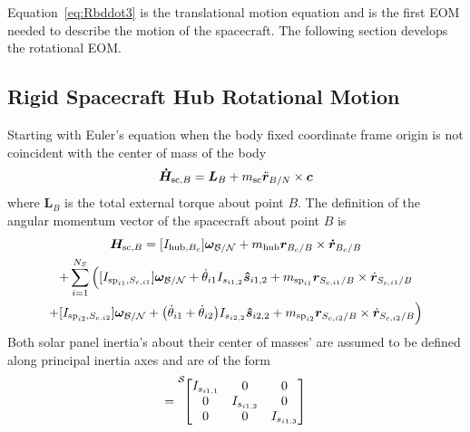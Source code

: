\documentclass[paper]{aiaaNew}
\begin{document}
	Equation~\eqref{eq:Rbddot3} is the translational motion equation and is the first EOM needed to describe the motion of the spacecraft. The following section develops the rotational EOM.
	
	\subsection{Rigid Spacecraft Hub Rotational Motion}
	
	Starting with Euler's equation when the body fixed coordinate frame origin is not coincident with the center of mass of the body\cite{schaub}
	\begin{equation}
	\bm{\dot{H}}_{\text{sc},B} = \bm{L}_B+m_{\text{\text{sc}}}\ddot{\bm r}_{B/N}\times\bm{c}
	\label{eq:Euler}
	\end{equation}
	where $\bm{L}_B$ is the total external torque about point $B$. The definition of the angular momentum vector of the spacecraft about point $B$ is
	\begin{multline}
	\bm{H}_{\text{sc},B} = [I_{\text{hub},B_c}] \bm\omega_{\cal B/N} + m_{\text{hub}} \bm{r}_{B_c/B}\times\bm{\dot{r}}_{B_c/B} \\ +\sum\limits_{i=1}^{N_S}\Big( [I_{\text{sp}_{i1},S_{c,i1}}] \bm\omega_{\cal B/N} + \dot{\theta}_{i1} I_{s_{i1,2}}\bm{\hat{s}}_{i1,2}+m_{\text{sp}_{i1}} \bm{r}_{S_{c,i1}/B} \times \dot{\bm r}_{S_{c,i1}/B}\\
	+ [I_{\text{sp}_{i2},S_{c,i2}}] \bm\omega_{\cal B/N} + \big(\dot{\theta}_{i1} + \dot{\theta}_{i2}\big) I_{s_{i2,2}}\bm{\hat{s}}_{i2,2}+m_{\text{sp}_{i2}} \bm{r}_{S_{c,i2}/B} \times \dot{\bm r}_{S_{c,i2}/B}\Big)
	\label{eq:Hb2}
	\end{multline}
	Both solar panel inertia's about their center of masses' are assumed to be defined along principal inertia axes and are of the form
	\begin{equation}
	[I_{\text{sp}_{i1},S_{c,i1}}] = \leftexp{S}{\begin{bmatrix}
		I_{s_{i1,1}} & 0 & 0 \\
		0 & I_{s_{i1,2}} & 0 \\
		0 & 0 & I_{s_{i1,3}}
		\end{bmatrix}}
	\label{eq:IspMatrix}
	\end{equation}
	
\end{document}
